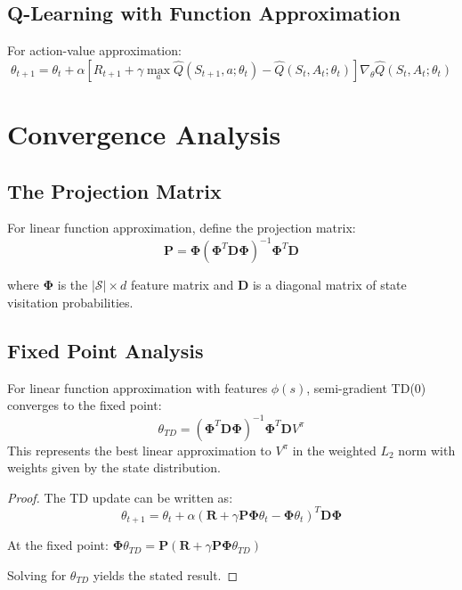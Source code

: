 \subsection{Q-Learning with Function Approximation}

For action-value approximation:
\begin{equation}
\theta_{t+1} = \theta_t + \alpha \left[ R_{t+1} + \gamma \max_a \hat{Q}(S_{t+1}, a; \theta_t) - \hat{Q}(S_t, A_t; \theta_t) \right] \nabla_\theta \hat{Q}(S_t, A_t; \theta_t)
\end{equation}

\section{Convergence Analysis}

\subsection{The Projection Matrix}

For linear function approximation, define the projection matrix:
\begin{equation}
\mathbf{P} = \mathbf{\Phi}(\mathbf{\Phi}^T \mathbf{D} \mathbf{\Phi})^{-1} \mathbf{\Phi}^T \mathbf{D}
\end{equation}

where $\mathbf{\Phi}$ is the $|\mathcal{S}| \times d$ feature matrix and $\mathbf{D}$ is a diagonal matrix of state visitation probabilities.

\subsection{Fixed Point Analysis}

\begin{theorem}
For linear function approximation with features $\phi(s)$, semi-gradient TD(0) converges to the fixed point:
\begin{equation}
\theta_{TD} = (\mathbf{\Phi}^T \mathbf{D} \mathbf{\Phi})^{-1} \mathbf{\Phi}^T \mathbf{D} V^\pi
\end{equation}
This represents the best linear approximation to $V^\pi$ in the weighted $L_2$ norm with weights given by the state distribution.
\end{theorem}

\begin{proof}
The TD update can be written as:
\begin{equation}
\theta_{t+1} = \theta_t + \alpha (\mathbf{R} + \gamma \mathbf{P} \mathbf{\Phi} \theta_t - \mathbf{\Phi} \theta_t)^T \mathbf{D} \mathbf{\Phi}
\end{equation}

At the fixed point: $\mathbf{\Phi} \theta_{TD} = \mathbf{P}(\mathbf{R} + \gamma \mathbf{P} \mathbf{\Phi} \theta_{TD})$

Solving for $\theta_{TD}$ yields the stated result.
\end{proof}

